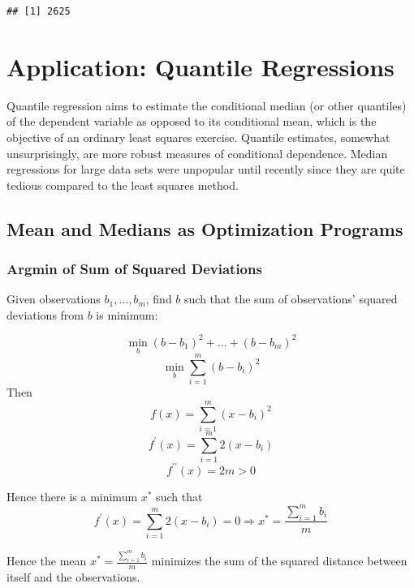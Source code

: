 \documentclass[11pt,]{article}
\newenvironment{Shaded}{\begin{snugshade}}{\end{snugshade}}
\newcommand{\OperatorTok}[1]{\textcolor[rgb]{0.81,0.36,0.00}{\textbf{#1}}}
\newcommand{\NormalTok}[1]{#1}
\begin{document}
\begin{Shaded}
\end{Shaded}

\begin{verbatim}
## [1] 2625
\end{verbatim}

\section{Application: Quantile
Regressions}\label{application-quantile-regressions}

Quantile regression aims to estimate the conditional median (or other
quantiles) of the dependent variable as opposed to its conditional mean,
which is the objective of an ordinary least squares exercise. Quantile
estimates, somewhat unsurprisingly, are more robust measures of
conditional dependence. Median regressions for large data sets were
unpopular until recently since they are quite tedious compared to the
least squares method.

\subsection{Mean and Medians as Optimization
Programs}\label{mean-and-medians-as-optimization-programs}

\subsubsection{Argmin of Sum of Squared
Deviations}\label{argmin-of-sum-of-squared-deviations}

Given observations \(b_1,\hdots,b_m\), find \(b\) such that the sum of
observations' squared deviations from \(b\) is minimum:

\[\min_b{} (b-b_1)^2+\hdots+(b-b_m)^2\]
\[\min_b{} \sum_{i=1}^m (b-b_i)^2\] Then
\[f(x) = \sum_{i=1}^m (x-b_i)^2\]
\[f^{\prime}(x) = \sum_{i=1}^m 2(x-b_i)\]
\[f^{\prime\prime}(x) = 2m > 0\]

Hence there is a minimum \(x^*\) such that
\[f^{\prime}(x) = \sum_{i=1}^m 2(x-b_i) = 0 \Rightarrow x^* = \frac{\sum_{i=1}^m b_i}{m}\]

Hence the mean \(x^* = \frac{\sum_{i=1}^m b_i}{m}\) minimizes the sum of
the squared distance between itself and the observations.
\end{document}
